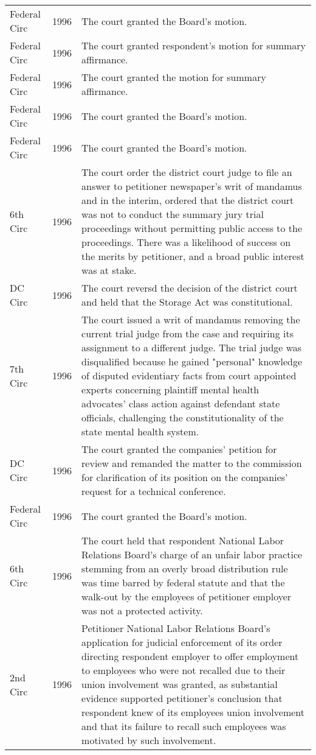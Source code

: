 \documentclass[10pt, letterpaper]{article}
\begin{document}
\begin{spacing}{1.0}
\begin{small}
\begin{longtable}[H]{llp{5in}}
    Federal Circ & 1996 & The court granted the Board's motion.\\[4pt]
    Federal Circ & 1996 & The court granted respondent's motion for summary affirmance.\\[4pt]
    Federal Circ & 1996 & The court granted the motion for summary affirmance.\\[4pt]
    Federal Circ & 1996 & The court granted the Board's motion.\\[4pt]
    Federal Circ & 1996 & The court granted the Board's motion.\\[4pt]
    6th Circ & 1996 & The court order the district court judge to file an answer to petitioner newspaper's writ of mandamus and in the interim, ordered that the district court was not to conduct the summary jury trial proceedings without permitting public access to the proceedings. There was a likelihood of success on the merits by petitioner, and a broad public interest was at stake.\\[4pt]
    DC Circ & 1996 & The court reversd the decision of the district court and held that the Storage Act was constitutional.\\[4pt]
    7th Circ & 1996 & The court issued a writ of mandamus removing the current trial judge from the case and requiring its assignment to a different judge. The trial judge was disqualified because he gained "personal" knowledge of disputed evidentiary facts from court appointed experts concerning plaintiff mental health advocates' class action against defendant state officials, challenging the constitutionality of the state mental health system.\\[4pt]
    DC Circ & 1996 & The court granted the companies' petition for review and remanded the matter to the commission for clarification of its position on the companies' request for a technical conference.\\[4pt]
    Federal Circ & 1996 & The court granted the Board's motion.\\[4pt]
    6th Circ & 1996 & The court held that respondent National Labor Relations Board's charge of an unfair labor practice stemming from an overly broad distribution rule was time barred by federal statute and that the walk-out by the employees of petitioner employer was not a protected activity.\\[4pt]
    2nd Circ & 1996 & Petitioner National Labor Relations Board's application for judicial enforcement of its order directing respondent employer to offer employment to employees who were not recalled due to their union involvement was granted, as substantial evidence supported petitioner's conclusion that respondent knew of its employees union involvement and that its failure to recall such employees was motivated by such involvement.\\[4pt]

\end{longtable}
\end{small}
\end{spacing}
\end{document}
